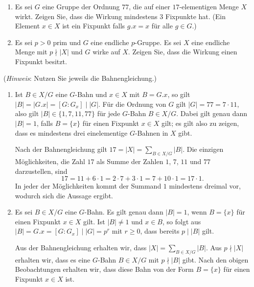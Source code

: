 \begin{question}[subtitle = Bahnenkombinatorik]
  \begin{enumerate}
    \item
      Es sei $G$ eine Gruppe der Ordnung $77$, die auf einer $17$-elementigen Menge $X$ wirkt.
      Zeigen Sie, dass die Wirkung mindestens $3$ Fixpunkte hat.
      (Ein Element $x \in X$ ist ein Fixpunkt falls $g.x = x$ für alle $g \in G$.)
    \item
      Es sei $p > 0$ prim und $G$ eine endliche $p$-Gruppe.
      Es sei $X$ eine endliche Menge mit $p \nmid |X|$ und $G$ wirke auf $X$.
      Zeigen Sie, dass die Wirkung einen Fixpunkt besitzt.
  \end{enumerate}
  (\emph{Hinweis}:
   Nutzen Sie jeweils die Bahnengleichung.)
\end{question}


\begin{solution}
  \begin{enumerate}
    \item
      Ist $B \in X/G$ eine $G$-Bahn und $x \in X$ mit $B = G.x$, so gilt $|B| = |G.x| = [G : G_x] \mid |G|$.
      Für die Ordnung von $G$ gilt $|G| = 77 = 7 \cdot 11$, also gilt $|B| \in \{1, 7, 11, 77\}$ für jede $G$-Bahn $B \in X/G$.
      Dabei gilt genau dann $|B| = 1$, falls $B = \{x\}$ für einen Fixpunkt $x \in X$ gilt;
      es gilt also zu zeigen, dass es mindestens drei einelementige $G$-Bahnen in $X$ gibt.
      
      Nach der Bahnengleichung gilt $17 = |X| = \sum_{B \in X/G} |B|$.
      Die einzigen Möglichkeiten, die Zahl $17$ als Summe der Zahlen $1$, $7$, $11$ und $77$ darzustellen, sind
      \[
          17
        = 11 + 6 \cdot 1
        = 2 \cdot 7 + 3 \cdot 1
        = 7 + 10 \cdot 1
        = 17 \cdot 1.
      \]
      In jeder der Möglichkeiten kommt der Summand $1$ mindestens dreimal vor, wodurch sich die Aussage ergibt.
      
    \item
      Es sei $B \in X/G$ eine $G$-Bahn.
      Es gilt genau dann $|B| = 1$, wenn $B = \{x\}$ für einen Fixpunkt $x \in X$ gilt.
      Ist $|B| \neq 1$ und $x \in B$, so folgt aus $|B| = G.x = [G : G_x] \mid |G| = p^r$ mit $r \geq 0$, dass bereits $p \mid |B|$ gilt.
      
      Aus der Bahnengleichung erhalten wir, dass $|X| = \sum_{B \in X/G} |B|$.
      Aus $p \nmid |X|$ erhalten wir, dass es eine $G$-Bahn $B \in X/G$ mit $p \nmid |B|$ gibt.
      Nach den obigen Beobachtungen erhalten wir, dass diese Bahn von der Form $B = \{x\}$ für einen Fixpunkt $x \in X$ ist.
  \end{enumerate}
\end{solution}



